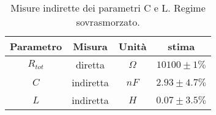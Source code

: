 \begin{table}[H]
\begin{center}
\begin{tabular}{|c|c|c|c|}
\hline

Parametro & Misura & Unità & stima \\ \hline

$R_{tot}$ & diretta & $\Omega$ & $10100\pm1\%$ \\ 

$C$ & indiretta & $nF$ & $2.93\pm4.7\%$ \\ 

$L$ & indiretta & $H$ & $0.07\pm3.5\%$ \\ 

\hline
\end{tabular}
\end{center}
\caption{
Misure indirette dei parametri C e L.
Regime sovrasmorzato.
}
\label{C4_P1_sovra_fit}
\end{table}